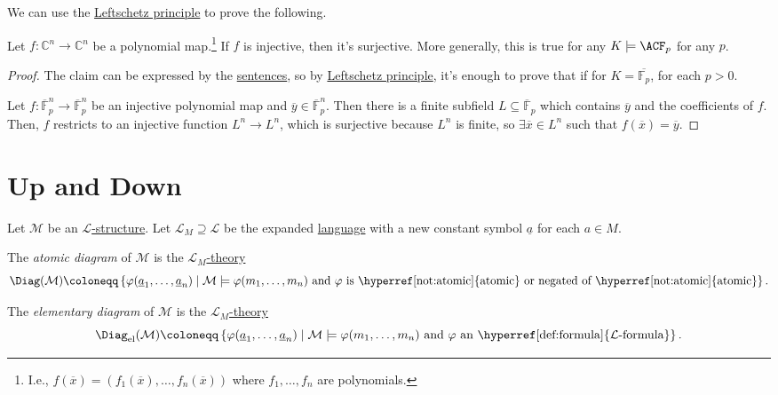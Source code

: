 We can use the \hyperref[thm:Leftschetz-principle]{Leftschetz principle} to prove the following.

\begin{theorem}\label{thm:Ax-Grothendieck}
	Let \(f\colon \mathbb{C} ^n \to \mathbb{C} ^n\) be a polynomial map.\footnote{I.e., \(f(\overline{x} ) = (f_1(\overline{x} ), \ldots , f_n(\overline{x} ))\) where \(f_1, \ldots , f_n\) are polynomials.} If \(f\) is injective, then it's surjective. More generally, this is true for any \(K \models \ACF_p\) for any \(p\).
\end{theorem}
\begin{proof}
	The claim can be expressed by the \hyperref[def:sentence]{sentences}, so by \hyperref[thm:Leftschetz-principle]{Leftschetz principle}, it's enough to prove that if for \(K = \overline{\mathbb{F}_p}\), for each \(p > 0\).

	Let \(f\colon \overline{\mathbb{F}}_p^n \to \overline{\mathbb{F}}_p^n\) be an injective polynomial map and \(\overline{y} \in \overline{\mathbb{F}}_p^n\). Then there is a finite subfield \(L \subseteq \overline{\mathbb{F}} _p \) which contains \(\overline{y}\) and the coefficients of \(f\). Then, \(f\) restricts to an injective function \(L^n \to L^n\), which is surjective because \(L^n\) is finite, so \(\exists \overline{x} \in L^n\) such that \(f(\overline{x} ) = \overline{y} \).
\end{proof}

\section{Up and Down}
\begin{definition*}
	Let \(\mathcal{M} \) be an \hyperref[def:structure]{\(\mathcal{L}\)-structure}. Let \(\mathcal{L} _M \supseteq \mathcal{L} \)  be the expanded \hyperref[def:language]{language} with a new constant symbol \(\underline{a}\) for each \(a\in M\).

	\begin{definition}\label{def:atomic-diagram}
		The \emph{atomic diagram} of \(\mathcal{M} \) is the \hyperref[def:theory]{\(\mathcal{L} _{M}\)-theory}
		\[
			\Diag(\mathcal{M} ) \coloneqq \left\{ \varphi (\underline{a}_1, \ldots , \underline{a}_n) \mid \mathcal{M} \models \varphi (m_1, \ldots , m_n) \text{ and \(\varphi \) is \hyperref[not:atomic]{atomic} or negated of \hyperref[not:atomic]{atomic}} \right\}.
		\]
	\end{definition}

	\begin{definition}\label{def:elementary-diagram}
		The \emph{elementary diagram} of \(\mathcal{M} \) is the \hyperref[def:theory]{\(\mathcal{L} _{M}\)-theory}
		\[
			\Diag_{\mathrm{el}}(\mathcal{M} ) \coloneqq \left\{ \varphi (\underline{a}_1, \ldots , \underline{a}_n) \mid \mathcal{M} \models \varphi (m_1, \ldots , m_n) \text{ and \(\varphi \) an \hyperref[def:formula]{\(\mathcal{L}\)-formula}} \right\}.
		\]
	\end{definition}
\end{definition*}


